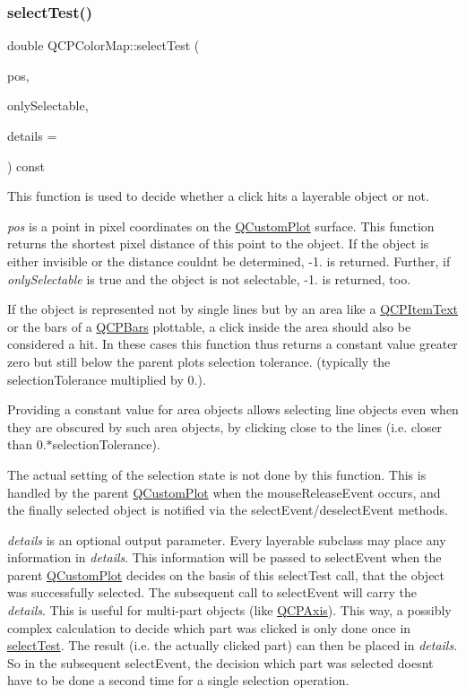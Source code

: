 \subsubsection{\texorpdfstring{select\+Test()}{selectTest()}}
{\footnotesize\ttfamily double Q\+C\+P\+Color\+Map\+::select\+Test (\begin{DoxyParamCaption}\item[{const Q\+PointF \&}]{pos,  }\item[{bool}]{only\+Selectable,  }\item[{Q\+Variant $\ast$}]{details = {} }\end{DoxyParamCaption}) const\hspace{0.3cm}{\ttfamily [virtual]}}

This function is used to decide whether a click hits a layerable object or not.

{\itshape pos} is a point in pixel coordinates on the \hyperlink{classQCustomPlot}{Q\+Custom\+Plot} surface. This function returns the shortest pixel distance of this point to the object. If the object is either invisible or the distance couldn\textquotesingle{}t be determined, -\/1. is returned. Further, if {\itshape only\+Selectable} is true and the object is not selectable, -\/1. is returned, too.

If the object is represented not by single lines but by an area like a \hyperlink{classQCPItemText}{Q\+C\+P\+Item\+Text} or the bars of a \hyperlink{classQCPBars}{Q\+C\+P\+Bars} plottable, a click inside the area should also be considered a hit. In these cases this function thus returns a constant value greater zero but still below the parent plot\textquotesingle{}s selection tolerance. (typically the selection\+Tolerance multiplied by 0.).

Providing a constant value for area objects allows selecting line objects even when they are obscured by such area objects, by clicking close to the lines (i.\+e. closer than 0.$\ast$selection\+Tolerance).

The actual setting of the selection state is not done by this function. This is handled by the parent \hyperlink{classQCustomPlot}{Q\+Custom\+Plot} when the mouse\+Release\+Event occurs, and the finally selected object is notified via the select\+Event/deselect\+Event methods.

{\itshape details} is an optional output parameter. Every layerable subclass may place any information in {\itshape details}. This information will be passed to select\+Event when the parent \hyperlink{classQCustomPlot}{Q\+Custom\+Plot} decides on the basis of this select\+Test call, that the object was successfully selected. The subsequent call to select\+Event will carry the {\itshape details}. This is useful for multi-\/part objects (like \hyperlink{classQCPAxis}{Q\+C\+P\+Axis}). This way, a possibly complex calculation to decide which part was clicked is only done once in \hyperlink{classQCPColorMap_afb4b843596addf58096082827a9e3450}{select\+Test}. The result (i.\+e. the actually clicked part) can then be placed in {\itshape details}. So in the subsequent select\+Event, the decision which part was selected doesn\textquotesingle{}t have to be done a second time for a single selection operation.

